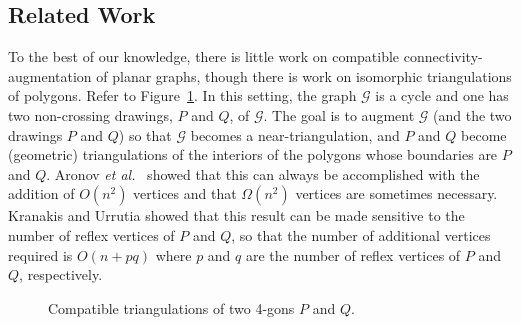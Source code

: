\documentclass[11pt]{patmorin}
\newcommand{\etal}{\emph{et al.}}
\begin{document}
\subsection{Related Work}

To the best of our knowledge, there is little work on
compatible connectivity-augmentation of planar graphs, though
there is work on isomorphic triangulations of polygons.  Refer to
Figure~\ref{fig:compatible-triangs}.  In this setting, the graph
$\mathcal{G}$ is a cycle and one has two non-crossing drawings, $P$
and $Q$, of $\mathcal G$. The goal is to augment $\mathcal G$ (and the
two drawings $P$ and $Q$) so that $\mathcal G$ becomes a near-triangulation,
and $P$ and $Q$ become (geometric) triangulations of the interiors
of the polygons whose boundaries are $P$ and $Q$.  Aronov \etal\
\cite{aronov.seidel.ea:on} showed that this can always
be accomplished with the addition of $O(n^2)$ vertices and that
$\Omega(n^2)$ vertices are sometimes necessary.  Kranakis and Urrutia
\cite{kranakis.urrutia:isomorphic} showed that this result can be made
sensitive to the number of reflex vertices of $P$ and $Q$, so that the
number of additional vertices required is $O(n+pq)$ where $p$ and $q$ are the
number of reflex vertices of $P$ and $Q$, respectively.

\begin{figure}
  \caption{Compatible triangulations of two 4-gons $P$ and $Q$.}
  \label{fig:compatible-triangs}
\end{figure}
\end{document}

